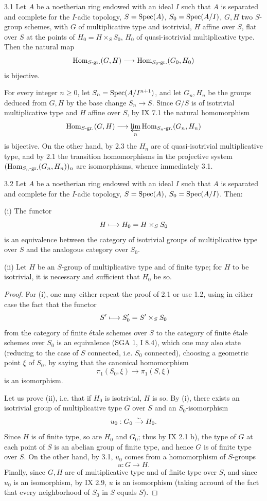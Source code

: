 \begin{lemma}{3.1}\label{X.3.1}
Let $A$ be a noetherian ring endowed with an ideal $I$ such that $A$ is separated and complete for the $I$-adic topology, $S=\operatorname{Spec}(A)$, $S_0=\operatorname{Spec}(A/I)$, $G,H$ two $S$-group schemes, with $G$ of multiplicative type and isotrivial, $H$ affine over $S$, flat over $S$ at the points of $H_0=H\times_S S_0$, $H_0$ of quasi-isotrivial multiplicative type. Then the natural map
\[
\operatorname{Hom}_{S\text{-}\mathrm{gr.}}(G,H)\longrightarrow\operatorname{Hom}_{S_0\text{-}\mathrm{gr.}}(G_0,H_0)
\]
is bijective.
\end{lemma}
For every integer $n\geq0$, let $S_n=\operatorname{Spec}(A/I^{n+1})$, and let $G_n,H_n$ be the groups deduced from $G,H$ by the base change $S_n\to S$. Since $G/S$ is of isotrivial multiplicative type and $H$ affine over $S$, by IX 7.1 the natural homomorphism
\[
\operatorname{Hom}_{S\text{-}\mathrm{gr.}}(G,H)\longrightarrow\varprojlim_n\operatorname{Hom}_{S_n\text{-}\mathrm{gr.}}(G_n,H_n)
\]
is bijective. On the other hand, by 2.3 the $H_n$ are of quasi-isotrivial multiplicative type, and by 2.1 the transition homomorphisms in the projective system $(\operatorname{Hom}_{S_n\text{-}\mathrm{gr.}}(G_n,H_n))_n$ are isomorphisms, whence immediately 3.1.
\begin{theorem}{3.2}\label{X.3.2}
Let $A$ be a noetherian ring endowed with an ideal $I$ such that $A$ is separated and complete for the $I$-adic topology, $S=\operatorname{Spec}(A)$, $S_0=\operatorname{Spec}(A/I)$. Then:

(i) The functor
\[
H\longmapsto H_0=H\times_S S_0
\]
is an equivalence between the category of isotrivial groups of multiplicative type over $S$ and the analogous category over $S_0$.

(ii) Let $H$ be an $S$-group of multiplicative type and of finite type; for $H$ to be isotrivial, it is necessary and sufficient that $H_0$ be so.
\end{theorem}
\begin{proof}
For (i), one may either repeat the proof of 2.1 or use 1.2, using in either case the fact that the functor
\[
S'\longmapsto S'_0=S'\times_S S_0
\]
from the category of finite étale schemes over $S$ to the category of finite étale schemes over $S_0$ is an equivalence (SGA 1, I 8.4), which one may also state (reducing to the case of $S$ connected, i.e. $S_0$ connected), choosing a geometric point $\xi$ of $S_0$, by saying that the canonical homomorphism
\[
\pi_1(S_0,\xi)\to\pi_1(S,\xi)
\]
is an isomorphism.

Let us prove (ii), i.e. that if $H_0$ is isotrivial, $H$ is so. By (i), there exists an isotrivial group of multiplicative type $G$ over $S$ and an $S_0$-isomorphism
\[
u_0:G_0\xrightarrow{\sim} H_0.
\]
 Since $H$ is of finite type, so are $H_0$ and $G_0$; thus by IX 2.1 b), the type of $G$ at each point of $S$ is an abelian group of finite type, and hence $G$ is of finite type over $S$. On the other hand, by 3.1, $u_0$ comes from a homomorphism of $S$-groups
\[
u:G\to H.
\]
Finally, since $G,H$ are of multiplicative type and of finite type over $S$, and since $u_0$ is an isomorphism, by IX 2.9, $u$ is an isomorphism (taking account of the fact that every neighborhood of $S_0$ in $S$ equals $S$).
\end{proof}
